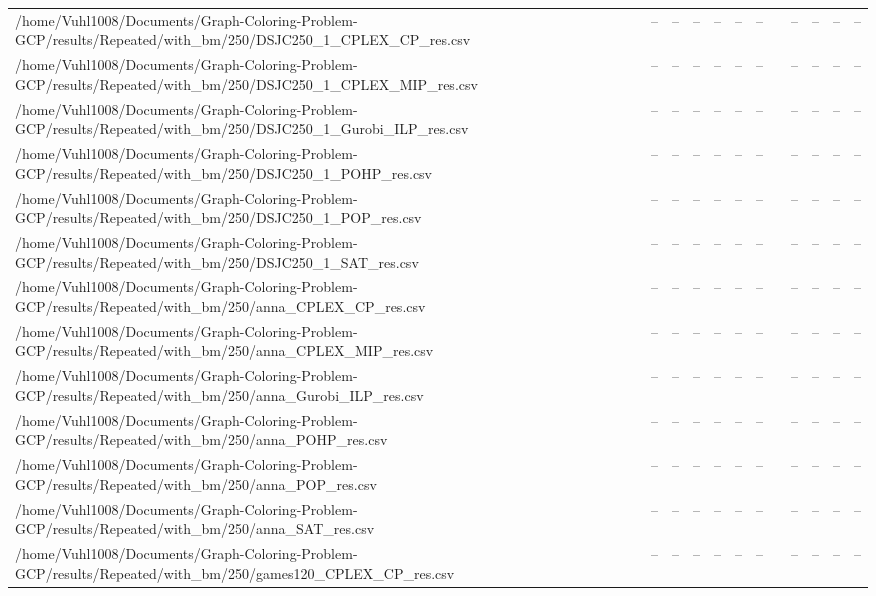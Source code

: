 \begin{table}[htbp]
\begin{tabular}{llllllllllll}
/home/Vuhl1008/Documents/Graph-Coloring-Problem-GCP/results/Repeated/with\_bm/250/DSJC250\_1\_CPLEX\_CP\_res.csv & -- & -- & -- & -- & -- & -- & {} & -- & -- & -- & -- \\
/home/Vuhl1008/Documents/Graph-Coloring-Problem-GCP/results/Repeated/with\_bm/250/DSJC250\_1\_CPLEX\_MIP\_res.csv & -- & -- & -- & -- & -- & -- & {} & -- & -- & -- & -- \\
/home/Vuhl1008/Documents/Graph-Coloring-Problem-GCP/results/Repeated/with\_bm/250/DSJC250\_1\_Gurobi\_ILP\_res.csv & -- & -- & -- & -- & -- & -- & {} & -- & -- & -- & -- \\
/home/Vuhl1008/Documents/Graph-Coloring-Problem-GCP/results/Repeated/with\_bm/250/DSJC250\_1\_POHP\_res.csv & -- & -- & -- & -- & -- & -- & {} & -- & -- & -- & -- \\
/home/Vuhl1008/Documents/Graph-Coloring-Problem-GCP/results/Repeated/with\_bm/250/DSJC250\_1\_POP\_res.csv & -- & -- & -- & -- & -- & -- & {} & -- & -- & -- & -- \\
/home/Vuhl1008/Documents/Graph-Coloring-Problem-GCP/results/Repeated/with\_bm/250/DSJC250\_1\_SAT\_res.csv & -- & -- & -- & -- & -- & -- & {} & -- & -- & -- & -- \\
/home/Vuhl1008/Documents/Graph-Coloring-Problem-GCP/results/Repeated/with\_bm/250/anna\_CPLEX\_CP\_res.csv & -- & -- & -- & -- & -- & -- & {} & -- & -- & -- & -- \\
/home/Vuhl1008/Documents/Graph-Coloring-Problem-GCP/results/Repeated/with\_bm/250/anna\_CPLEX\_MIP\_res.csv & -- & -- & -- & -- & -- & -- & {} & -- & -- & -- & -- \\
/home/Vuhl1008/Documents/Graph-Coloring-Problem-GCP/results/Repeated/with\_bm/250/anna\_Gurobi\_ILP\_res.csv & -- & -- & -- & -- & -- & -- & {} & -- & -- & -- & -- \\
/home/Vuhl1008/Documents/Graph-Coloring-Problem-GCP/results/Repeated/with\_bm/250/anna\_POHP\_res.csv & -- & -- & -- & -- & -- & -- & {} & -- & -- & -- & -- \\
/home/Vuhl1008/Documents/Graph-Coloring-Problem-GCP/results/Repeated/with\_bm/250/anna\_POP\_res.csv & -- & -- & -- & -- & -- & -- & {} & -- & -- & -- & -- \\
/home/Vuhl1008/Documents/Graph-Coloring-Problem-GCP/results/Repeated/with\_bm/250/anna\_SAT\_res.csv & -- & -- & -- & -- & -- & -- & {} & -- & -- & -- & -- \\
/home/Vuhl1008/Documents/Graph-Coloring-Problem-GCP/results/Repeated/with\_bm/250/games120\_CPLEX\_CP\_res.csv & -- & -- & -- & -- & -- & -- & {} & -- & -- & -- & -- \\

\end{tabular}
\end{table}
